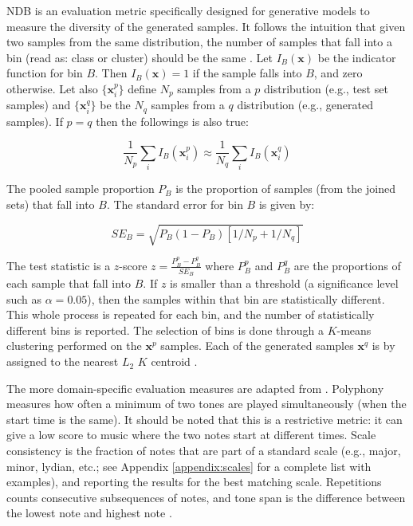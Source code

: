 \documentclass[a4paper]{book}
\begin{document}
NDB is an evaluation metric specifically designed for generative models to measure the diversity of the generated samples. It follows the intuition that given two samples from the same distribution, the number of samples that fall into a bin (read as: class or cluster) should be the same \parencite{richardson_gans_2018}. Let $I_B(\mathbf{x})$ be the indicator function for bin $B$. Then $I_B(\mathbf{x}) = 1$ if the sample falls into $B$, and zero otherwise. Let also $\{\mathbf{x}_i^p\}$ define $N_p$ samples from a $p$ distribution (e.g., test set samples) and $\{\mathbf{x}_i^q\}$ be the $N_q$ samples from a $q$ distribution (e.g., generated samples). If $p = q$ then the followings is also true:

\begin{equation}
    \frac{1}{N_p} \sum_i I_B(\mathbf{x}_i^p) \approx \frac{1}{N_q} \sum_i I_B(\mathbf{x}_i^q)
\end{equation}

The pooled sample proportion $P_B$ is the proportion of samples (from the joined sets) that fall into $B$. The standard error for bin $B$ is given by:

\begin{equation}
    SE_B = \sqrt{P_B (1 - P_B)[1 / N_p + 1 / N_q]}
\end{equation}

The test statistic is a $z$-score $z = \frac{P_B^p - P_B^q}{SE_B}$ where $P_B^p$ and $P_B^q$ are the proportions of each sample that fall into $B$. If $z$ is smaller than a threshold (a significance level such as $\alpha = 0.05$), then the samples within that bin are statistically different. This whole process is repeated for each bin, and the number of statistically different bins is reported. The selection of bins is done through a $K$-means clustering performed on the $\mathbf{x}^p$ samples. Each of the generated samples $\mathbf{x}^q$ is by assigned to the nearest $L_2$ $K$ centroid \parencite{richardson_gans_2018}.

The more domain-specific evaluation measures are adapted from \textcite{mogren_c-rnn-gan_2016}. Polyphony measures how often a minimum of two tones are played simultaneously (when the start time is the same). It should be noted that this is a restrictive metric: it can give a low score to music where the two notes start at different times. Scale consistency is the fraction of notes that are part of a standard scale (e.g., major, minor, lydian, etc.; see Appendix \ref{appendix:scales} for a complete list with examples), and reporting the results for the best matching scale. Repetitions counts consecutive subsequences of notes, and tone span is the difference between the lowest note and highest note \parencite[counted in semi-tones;][]{mogren_c-rnn-gan_2016}.
\end{document}
